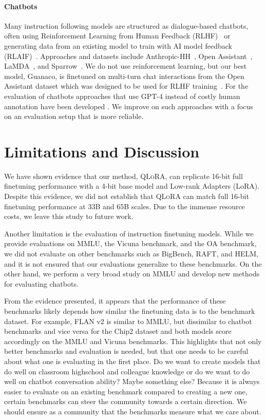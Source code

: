 \documentclass{article}
\newcommand{\method}{\textsc{QLoRA}\xspace}
\begin{document}
\paragraph{Chatbots} Many instruction following models are structured as dialogue-based chatbots, often using Reinforcement Learning from Human Feedback (RLHF)~\citep{christiano2017deep} or generating data from an existing model to train with AI model feedback (RLAIF)~\citep{bai2022constitutional}. Approaches and datasets include Anthropic-HH~\citep{askell2021general,bai2022training}, Open Assistant~\citep{kopf2023openassistant}, LaMDA~\citep{thoppilan2022lamda}, and Sparrow~\citep{glaese2022improving}. 
We do not use reinforcement learning, but our best model, Guanaco, is finetuned on multi-turn chat interactions from the Open Assistant dataset which was designed to be used for RLHF training~\citep{kopf2023openassistant}. For the evaluation of chatbots approaches that use GPT-4 instead of costly human annotation have been developed \citep{vicuna2023,peng2023instruction}. We improve on such approaches with a focus on an evaluation setup that is more reliable.

\section{Limitations and Discussion}

We have shown evidence that our method, \method, can replicate 16-bit full finetuning performance with a 4-bit base model and Low-rank Adapters (LoRA). Despite this evidence, we did not establish that \method can match full 16-bit finetuning performance at 33B and 65B scales. Due to the immense resource costs, we leave this study to future work. 

Another limitation is the evaluation of instruction finetuning models. While we provide evaluations on MMLU, the Vicuna benchmark, and the OA benchmark, we did not evaluate on other benchmarks such as BigBench, RAFT, and HELM, and it is not ensured that our evaluations generalize to these benchmarks. On the other hand, we perform a very broad study on MMLU and develop new methods for evaluating chatbots.

From the evidence presented, it appears that the performance of these benchmarks likely depends how similar the finetuning data is to the benchmark dataset. For example, FLAN v2 is similar to MMLU, but dissimilar to chatbot benchmarks and vice versa for the Chip2 dataset and both models score accordingly on the MMLU and Vicuna benchmarks. This highlights that not only better benchmarks and evaluation is needed, but that one needs to be careful about what one is evaluating in the first place. Do we want to create models that do well on classroom highschool and colleague knowledge or do we want to do well on chatbot conversation ability? Maybe something else? Because it is always easier to evaluate on an existing benchmark compared to creating a new one, certain benchmarks can steer the community towards a certain direction. We should ensure as a community that the benchmarks measure what we care about. 
\end{document}
